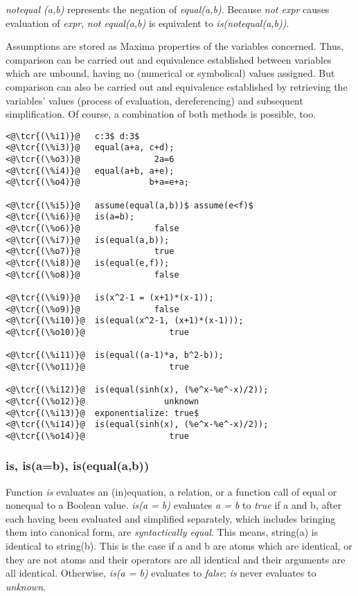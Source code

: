 \documentclass[../Maxima_Workbook.tex]{subfiles}
\begin{document}
\lz \emph{notequal (a,b)} represents the negation of \emph{equal(a,b)}. Because \emph{not expr} causes evaluation of \emph{expr}, \emph{not equal(a,b)} is equivalent to \emph{is(notequal(a,b))}.

\lz Assumptions are stored as Maxima properties of the variables concerned. Thus, comparison can be carried out and equivalence established between variables which are unbound, having no (numerical or symbolical) values assigned. But comparison can also be carried out and equivalence established by retrieving the variables' values (process of evaluation, dereferencing) and subsequent simplification. Of course, a combination of both methods is possible, too.

\lz \begin{lstlisting}
<@\tcr{(\%i1)}@   c:3$ d:3$
<@\tcr{(\%i3)}@   equal(a+a, c+d);
<@\tcr{(\%o3)}@			      2a=6
<@\tcr{(\%i4)}@   equal(a+b, a+e);
<@\tcr{(\%o4)}@			     b+a=e+a;

<@\tcr{(\%i5)}@   assume(equal(a,b))$ assume(e<f)$
<@\tcr{(\%i6)}@   is(a=b);
<@\tcr{(\%o6)}@			      false
<@\tcr{(\%i7)}@   is(equal(a,b));
<@\tcr{(\%o7)}@			      true
<@\tcr{(\%i8)}@   is(equal(e,f));
<@\tcr{(\%o8)}@			      false

<@\tcr{(\%i9)}@   is(x^2-1 = (x+1)*(x-1));
<@\tcr{(\%o9)}@			      false
<@\tcr{(\%i10)}@  is(equal(x^2-1, (x+1)*(x-1)));
<@\tcr{(\%o10)}@			     true

<@\tcr{(\%i11)}@  is(equal((a-1)*a, b^2-b));
<@\tcr{(\%o11)}@			     true

<@\tcr{(\%i12)}@  is(equal(sinh(x), (%e^x-%e^-x)/2));
<@\tcr{(\%o12)}@			    unknown
<@\tcr{(\%i13)}@  exponentialize: true$
<@\tcr{(\%i14)}@  is(equal(sinh(x), (%e^x-%e^-x)/2));
<@\tcr{(\%o14)}@			     true
\end{lstlisting}

\subsubsection{is, is(a=b), is(equal(a,b))}

\lz {} \hfill \tcr{[function]}

\lz Function \emph{is} evaluates an (in)equation, a relation, or a function call of equal or nonequal to a Boolean value. \emph{is(a = b)} evaluates \emph{a = b} to \emph{true} if a and b, after each having been evaluated and simplified separately, which includes bringing them into canonical form, are \emph{syntactically equal}. This means, string(a) is identical to string(b). This is the case if a and b are atoms which are identical, or they are not atoms and their operators are all identical and their arguments are all identical. Otherwise, \emph{is(a = b)} evaluates to \emph{false}; \emph{is} never evaluates to \emph{unknown}. 
\end{document}
